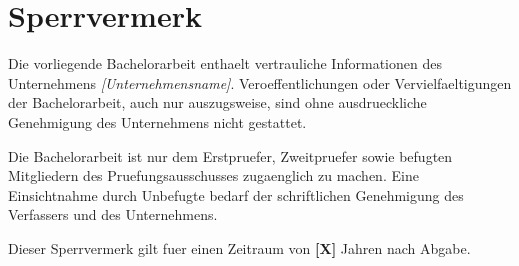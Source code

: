 \ifsperrvermerk
\chapter*{Sperrvermerk}

Die vorliegende Bachelorarbeit enthaelt vertrauliche Informationen des Unternehmens \textit{[Unternehmensname]}. Veroeffentlichungen oder Vervielfaeltigungen der Bachelorarbeit, auch nur auszugsweise, sind ohne ausdrueckliche Genehmigung des Unternehmens nicht gestattet.

Die Bachelorarbeit ist nur dem Erstpruefer, Zweitpruefer sowie befugten Mitgliedern des Pruefungsausschusses zugaenglich zu machen. Eine Einsichtnahme durch Unbefugte bedarf der schriftlichen Genehmigung des Verfassers und des Unternehmens.

Dieser Sperrvermerk gilt fuer einen Zeitraum von \textbf{[X]} Jahren nach Abgabe.
\fi
